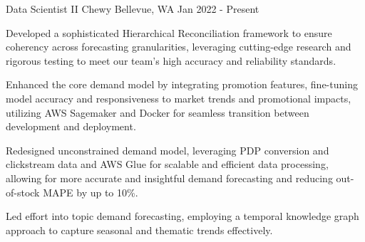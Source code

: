 

\begin{cventries}

  \cventry
    {Data Scientist II} %
    {Chewy} %
    {Bellevue, WA} %
    {Jan 2022 - Present} %
    {
      \begin{cvitems}
        \item {Developed a sophisticated Hierarchical Reconciliation framework to ensure coherency across forecasting granularities, leveraging cutting-edge research and rigorous testing to meet our team's high accuracy and reliability standards.}
        \item {Enhanced the core demand model by integrating promotion features, fine-tuning model accuracy and responsiveness to market trends and promotional impacts, utilizing AWS Sagemaker and Docker for seamless transition between development and deployment.}
        \item {Redesigned unconstrained demand model, leveraging PDP conversion and clickstream data and AWS Glue for scalable and efficient data processing, allowing for more accurate and insightful demand forecasting and reducing out-of-stock MAPE by up to 10\%.}
        \item {Led effort into topic demand forecasting, employing a temporal knowledge graph approach to capture seasonal and thematic trends effectively.}
    \end{cvitems}
    }


\end{cventries}
